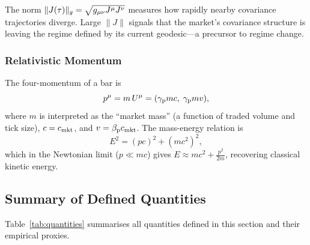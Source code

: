 The norm $\|J(\tau)\|_g = \sqrt{g_{\mu\nu} J^\mu J^\nu}$ measures how
rapidly nearby covariance trajectories diverge.  Large $\|J\|$ signals that
the market's covariance structure is leaving the regime defined by its current
geodesic---a precursor to regime change.

\subsubsection{Relativistic Momentum}

The four-momentum of a bar is
\begin{equation}
  p^\mu = m \, U^\mu = (\gamma_{\mathrm{p}} m c,\; \gamma_{\mathrm{p}} m v),
  \label{eq:four_momentum}
\end{equation}
where $m$ is interpreted as the ``market mass'' (a function of traded volume
and tick size), $c = c_{\mathrm{mkt}}$, and $v = \beta_{\mathrm{p}} c_{\mathrm{mkt}}$.  The
mass-energy relation is
\begin{equation}
  E^2 = (pc)^2 + (mc^2)^2,
  \label{eq:energy_momentum}
\end{equation}
which in the Newtonian limit ($p \ll mc$) gives $E \approx mc^2 +
\tfrac{p^2}{2m}$, recovering classical kinetic energy.

\subsection{Summary of Defined Quantities}

Table~\ref{tab:quantities} summarises all quantities defined in this section
and their empirical proxies.

